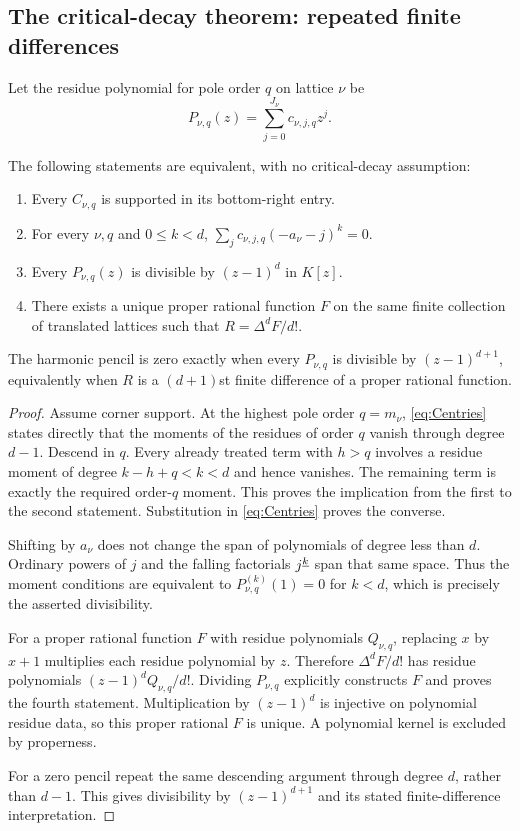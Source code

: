 \subsection{The critical-decay theorem: repeated finite differences}
Let the residue polynomial for pole order $q$ on lattice $\nu$ be
\begin{equation}\label{eq:Pq}
 P_{\nu,q}(z)=\sum_{j=0}^{J_\nu}c_{\nu,j,q}z^j.
\end{equation}

\begin{lemma}
\label{lem:corner-divisibility}
The following statements are equivalent, with no critical-decay assumption:
\begin{enumerate}
\item Every $C_{\nu,q}$ is supported in its bottom-right entry.
\item For every $\nu,q$ and $0\le k<d$,
      $\sum_jc_{\nu,j,q}(-a_\nu-j)^k=0$.
\item Every $P_{\nu,q}(z)$ is divisible by $(z-1)^d$ in $K[z]$.
\item There exists a unique proper rational function $F$ on the same
      finite collection of translated lattices such that
      $R=\Delta^dF/d!$.
\end{enumerate}
The harmonic pencil is zero exactly when every $P_{\nu,q}$ is
divisible by $(z-1)^{d+1}$, equivalently when $R$ is a
$(d+1)$st finite difference of a proper rational function.
\end{lemma}
\begin{proof}
Assume corner support. At the highest pole order $q=m_\nu$,
\eqref{eq:Centries} states directly that the moments of the residues
of order $q$ vanish through degree $d-1$. Descend in $q$.
Every already treated term with $h>q$ involves a residue moment of
degree $k-h+q<k<d$ and hence vanishes. The remaining term is exactly
the required order-$q$ moment. This proves the implication from the
first to the second statement. Substitution in \eqref{eq:Centries}
proves the converse.

Shifting by $a_\nu$ does not change the span of polynomials of degree
less than $d$. Ordinary powers of $j$ and the falling factorials
$j^{\underline{k}}$ span that same space. Thus the moment conditions are
equivalent to $P_{\nu,q}^{(k)}(1)=0$ for $k<d$, which is precisely
the asserted divisibility.

For a proper rational function $F$ with residue polynomials
$Q_{\nu,q}$, replacing $x$ by $x+1$ multiplies each residue polynomial
by $z$. Therefore $\Delta^dF/d!$ has residue polynomials
$(z-1)^dQ_{\nu,q}/d!$. Dividing $P_{\nu,q}$ explicitly constructs
$F$ and proves the fourth statement. Multiplication by $(z-1)^d$
is injective on polynomial residue data, so this proper rational $F$
is unique. A polynomial kernel is excluded by properness.

For a zero pencil repeat the same descending argument through degree
$d$, rather than $d-1$. This gives divisibility by $(z-1)^{d+1}$
and its stated finite-difference interpretation.
\end{proof}

